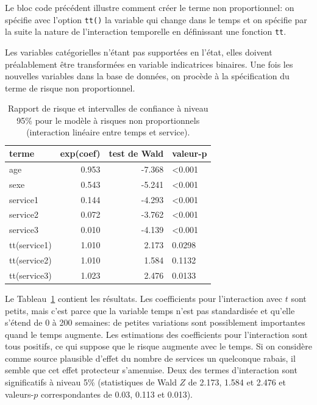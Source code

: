 \documentclass[
  11pt,
  letterpaper,
]{scrbook}
\theoremstyle{definition}
\theoremstyle{remark}
\begin{document}
Le bloc code précédent illustre comment créer le terme non
proportionnel: on spécifie avec l'option \texttt{tt()} la variable qui
change dans le temps et on spécifie par la suite la nature de
l'interaction temporelle en définissant une fonction \texttt{tt}.

Les variables catégorielles n'étant pas supportées en l'état, elles
doivent préalablement être transformées en variable indicatrices
binaires. Une fois les nouvelles variables dans la base de données, on
procède à la spécification du terme de risque non proportionnel.

\begin{longtable}[t]{lrrl}

\caption{\label{tbl-coxnph}Rapport de risque et intervalles de confiance
à niveau 95\% pour le modèle à risques non proportionnels (interaction
linéaire entre temps et service).}

\tabularnewline

\toprule
terme & exp(coef) & test de Wald & valeur-p\\
\midrule
age & 0.953 & -7.368 & <0.001\\
sexe & 0.543 & -5.241 & <0.001\\
service1 & 0.144 & -4.293 & <0.001\\
service2 & 0.072 & -3.762 & <0.001\\
service3 & 0.010 & -4.139 & <0.001\\
\addlinespace
tt(service1) & 1.010 & 2.173 & 0.0298\\
tt(service2) & 1.010 & 1.584 & 0.1132\\
tt(service3) & 1.023 & 2.476 & 0.0133\\
\bottomrule

\end{longtable}

Le Tableau~\ref{tbl-coxnph} contient les résultats. Les coefficients
pour l'interaction avec \(t\) sont petits, mais c'est parce que la
variable temps n'est pas standardisée et qu'elle s'étend de 0 à 200
semaines: de petites variations sont possiblement importantes quand le
temps augmente. Les estimations des coefficients pour l'interaction sont
tous positifs, ce qui suppose que le risque augmente avec le temps. Si
on considère comme source plausible d'effet du nombre de services un
quelconque rabais, il semble que cet effet protecteur s'amenuise. Deux
des termes d'interaction sont significatifs à niveau 5\% (statistiques
de Wald \(Z\) de 2.173, 1.584 et 2.476 et valeurs-\(p\) correspondantes
de 0.03, 0.113 et 0.013).
\end{document}
